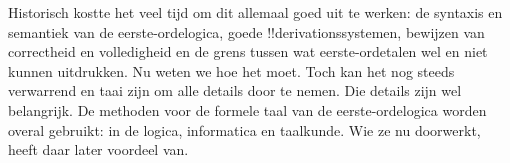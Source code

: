 \documentclass[../../../include/open-logic-section]{subfiles}
\begin{document}
Historisch kostte het veel tijd om dit allemaal goed uit te werken:
de syntaxis en semantiek van de eerste-ordelogica, goede
!!{derivation}ssystemen, bewijzen van correctheid en volledigheid en de
grens tussen wat eerste-ordetalen wel en niet kunnen uitdrukken. Nu
weten we hoe het moet. Toch kan het nog steeds verwarrend en taai zijn
om alle details door te nemen. Die details zijn wel belangrijk. De
methoden voor de formele taal van de eerste-ordelogica worden overal
gebruikt: in de logica, informatica en taalkunde. Wie ze nu doorwerkt,
heeft daar later voordeel van.
\end{document}
